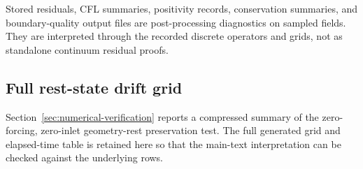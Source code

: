 Stored residuals, CFL summaries, positivity records, conservation summaries,
and boundary-quality output files are post-processing diagnostics on sampled fields.
They are interpreted through the recorded discrete operators and grids, not as
standalone continuum residual proofs.

\subsection{Full rest-state drift grid}
\label{app:num-full-rest-state-drift-grid}

Section~\ref{sec:numerical-verification} reports a compressed summary of the
zero-forcing, zero-inlet geometry-rest preservation test. The full generated
grid and elapsed-time table is retained here so that the main-text
interpretation can be checked against the underlying rows.

